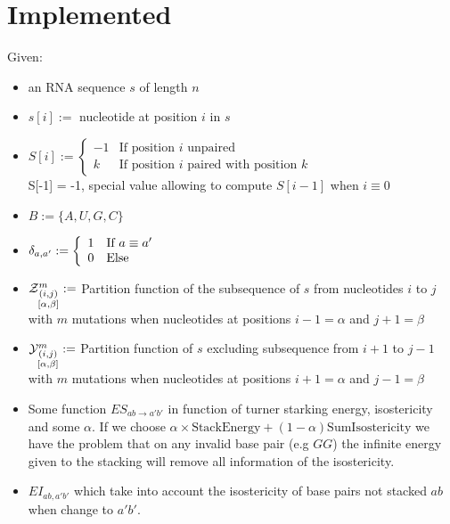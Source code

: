 \documentclass[11pt]{article} %
\begin{document}
\section{Implemented}
Given:
\begin{itemize}
	\item an RNA sequence $s$ of length $n$
	\item $s[i]:=$ nucleotide at position $i$ in $s$
	\item $\displaystyle
		S[i]:=\left\{
		\begin{array}{rl}
			-1 & \text{If position }i \text{ unpaired}\\
	 		k  & \text{If position }i \text{ paired with position }k
		\end{array}\right.
		$\\
		S[-1] = -1, special value allowing to compute $S[i-1]$ when $i\equiv 0$
	\item $B:=\{A, U, G, C\}$
	\item $ \delta_{a,a'}:=\left\{
		\begin{array}{ll}
			1 &\text{If }a \equiv a'\\
			0 &\text{Else}
		\end{array}\right.$
	\item $\Z{i,j}{m}{\alpha,\beta}:=$ Partition function of the subsequence of $s$ from nucleotides 
	$i$ to $j$ with $m$ mutations when nucleotides at positions $i-1=\alpha$ and $j+1=\beta$
	\item $\Y{i,j}{m}{\alpha,\beta}:=$ Partition function of $s$ excluding subsequence  from $i+1$ to 
	$j-1$ with $m$ mutations when nucleotides at positions $i+1=\alpha$ and $j-1=\beta$ 	
	\item Some function $ES_{ab \to a'b'}$ in function of turner starking energy, isostericity and
	  	some $\alpha$. If we choose $\alpha\times\text{StackEnergy} + (1-\alpha)\text{SumIsostericity}$ 
		we 	have the problem that on any invalid base pair (e.g $GG$) the infinite energy given to the 
		stacking 	will remove all information of the isostericity. 
	\item $EI_{ab,a'b'}$ which take into account the isostericity of base pairs not stacked $ab$ when 
	change to $a'b'$.
\end{itemize}
	
	
\end{document}
